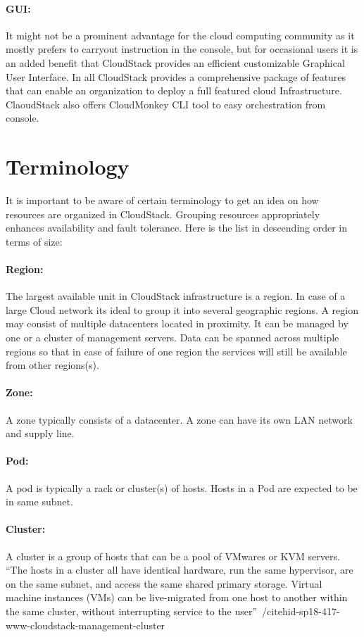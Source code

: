 \paragraph{GUI:} It might not be a prominent advantage for the cloud
computing community as it mostly prefers to carryout instruction in
the console, but for occasional users it is an added benefit that
CloudStack provides an efficient customizable Graphical User
Interface. In all CloudStack provides a comprehensive package of
features that can enable an organization to deploy a full featured
cloud Infrastructure. ClaoudStack also offers CloudMonkey CLI 
tool to easy orchestration from console.

\section{Terminology}

It is important to be aware of certain terminology to get an idea on
how resources are organized in CloudStack. Grouping resources 
appropriately enhances availability and fault tolerance. Here is the 
list in descending order in terms of size:
\paragraph{Region:}	The largest available unit in CloudStack infrastructure is a 
region. In case of a large Cloud network its ideal to group it into 
several geographic regions. A region may consist of multiple datacenters
located in proximity. It can be managed by one or a cluster of management
servers. Data can be spanned across multiple regions so that in case of
failure of one region the services will still be available from other regions(s).
\paragraph{Zone:}	A zone typically consists of a datacenter. A zone can have its own LAN
network and supply line. 
\paragraph{Pod:}	A pod is typically a rack or cluster(s) of hosts. Hosts in a Pod are 
expected to be in same subnet. 
\paragraph{Cluster:} 	A cluster is a group of hosts that can be a pool of VMwares or KVM 
servers. ``The hosts in a cluster all have identical hardware, run the same 
hypervisor, are on the same subnet, and access the same shared primary storage.
Virtual machine instances (VMs) can be live-migrated from one host to another
within the same cluster, without interrupting service to the user''~/cite{hid-sp18-417-www-cloudstack-management-cluster}
